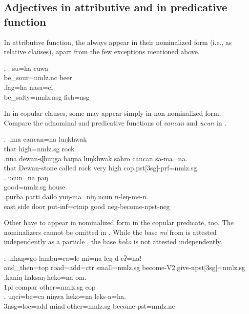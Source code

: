	
\subsection{Adjectives in attributive and in predicative function}\label{sec-adj-str}

In attributive function, the  always appear in their nominalized form (i.e., as relative clauses), apart from  the few exceptions mentioned above. 

\ex. \ag. su=ha cuwa\\
	be\_sour{\sc =nmlz.nc} beer\\
\bg.lag=ha nasa=ci\\
		be\_salty{\sc =nmlz.nsg} fish{\sc =nsg}	\\
	
In  in copular clauses, some  may appear simply in non-nominalized  form. Compare the adnominal and predicative functions of \emph{cancan}  and  \emph{ucun}  in \Next. 

\ex. \ag.nna   cancan=na luŋkhwak\\
		that high{\sc =nmlz.sg} rock	\\
	 
 	\bg.nna  dewan-ɖhuŋga baŋna luŋkhwak sahro cancan sa-ma=na.\\
	that Dewan-stone called rock very high {\sc cop.pst[3sg]-prf=nmlz.sg}	\\
	 
\bg. ucun=na paŋ\\ 
	good{\sc =nmlz.sg} house\\ 
	 \bg.purba patti dailo yuŋ-ma=niŋ  ucun n-leŋ-me-n.\\
	east side door put-{\sc inf=ctmp} good {\sc neg-}become{\sc [3sg]-npst-neg}\\
	 
	
Other  have to appear in nominalized form in the copular predicate, too. The nominalizers  cannot  be omitted in \Next. While the base \emph{mi} from \Next[a] is attested independently as a  particle , the base \emph{heko} is not attested independently.

	\ex. \ag.nhaŋ=go        lambu=ca=le                 mi=na  leŋ-d-eʔ=na!\\
	and\_then{\sc =top} road{\sc =add=ctr} small{\sc =nmlz.sg}  become{\sc -V2.give-npst[3sg]=nmlz.sg}\\
	 
	\bg.kaniŋ haksaŋ   heko=na         om.\\
	{\sc 1pl} {\sc compar} other{\sc =nmlz.sg} {\sc cop}\\
	 
\bg.  uŋci=be=ca           niŋwa heko=na         leks-a=ha.\\
{\sc 3nsg=loc=add} mind other{\sc =nmlz.sg} become{\sc [3sg]-pst=nmlz.nc}\\
 

